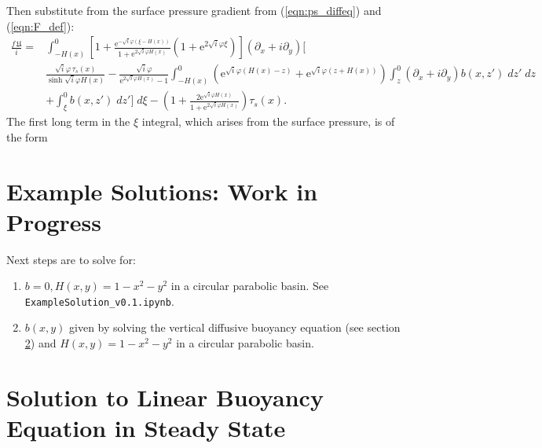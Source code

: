 \documentclass[10pt]{amsart}
\begin{document}
Then substitute from the surface pressure gradient from (\ref{eqn:ps_diffeq}) and (\ref{eqn:F_def}):
\begin{align}
\frac{f \, \mathfrak{U}}{i} 
 = & 
\int_{-H(x)}^{0} 
\left[ 1 +
\frac{ \mathrm{e}^{-\sqrt{i} \varphi (\xi - H(x))  } }{ 1 + \mathrm{e}^{2 \sqrt{i} \varphi H \left(x \right)} }
\left( 1 + \mathrm{e}^{2 \sqrt{i} \varphi \xi}\right) 
\right]
 \left( \partial_x + i \partial_y \right) \Bigg[
 \nonumber \\
&
 \frac{\sqrt{i} \varphi\, \tau_s (x)} { \sinh \sqrt{i} \varphi H(x)} 
 -
  \frac{\sqrt{i} \varphi} { \mathrm{e}^{2 \sqrt{i} \varphi H(x)} - 1 }
\int_{-H(x)}^{0} 
\left( \mathrm{e}^{\sqrt{i} \varphi \left(H(x) - z\right)} + \mathrm{e}^{\sqrt{i} \varphi \left(z + H(x) \right)} \right) 
 \int_{z}^{0} \left( \partial_x + i \partial_y \right)  b(x,z') \; dz' \; dz 
\nonumber \\
&  + \int_{\xi}^{0} b(x,z') \; dz' \Bigg] \; d \xi  -
 \left( 1
+\frac{ 2 \mathrm{e}^{\sqrt{i} \varphi H(x)  } }{ 1 + \mathrm{e}^{2 \sqrt{i} \varphi H \left(x \right)} }
 \right) \tau_s(x) . \nonumber
 \end{align}
 The first long term in the $\xi$ integral, which arises from the surface pressure, is of the form
 
\clearpage 
 













\section{Example Solutions: Work in Progress}


Next steps are to solve for:
\begin{enumerate}
\item $b=0, H(x,y) = 1 - x^2 - y^2$ in a circular parabolic basin. See \texttt{ExampleSolution\_v0.1.ipynb}.
\item $b(x,y)$ given by solving the vertical diffusive buoyancy equation (see section \ref{sec:b_solution}) and $H(x,y) = 1 - x^2 - y^2$ in a circular parabolic basin.
\end{enumerate}

\section{Solution to Linear Buoyancy Equation in Steady State}
\label{sec:b_solution}
\end{document}
